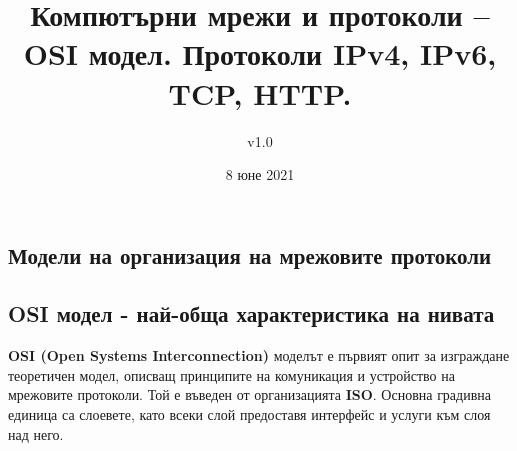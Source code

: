 \documentclass[fleqn,12pt]{article}
\title{Компютърни мрежи и протоколи – OSI модел. Протоколи IPv4,  IPv6, TCP, HTTP.}
\author{v1.0}
\date{8 юне 2021}
\begin{document}
\maketitle

\tableofcontents
\pagebreak

\begin{flushleft}

\section{Модели на организация на мрежовите протоколи}
\subsection{OSI модел - най-обща характеристика на нивата}
\textbf{OSI (Open Systems Interconnection)} моделът е първият опит за изграждане теоретичен модел, описващ принципите на комуникация и устройство на мрежовите протоколи.
Той е въведен от организацията \textbf{ISO}. Основна градивна единица са слоевете, като всеки слой предоставя интерфейс и услуги към слоя над него.


\end{flushleft}
\end{document}
